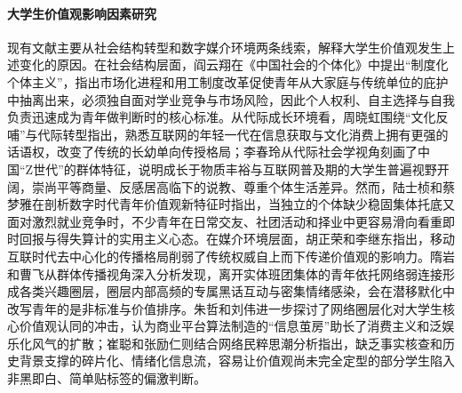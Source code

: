 \paragraph{大学生价值观影响因素研究}
现有文献主要从社会结构转型和数字媒介环境两条线索，解释大学生价值观发生上述变化的原因。在社会结构层面，阎云翔在《中国社会的个体化》中提出“制度化个体主义”，指出市场化进程和用工制度改革促使青年从大家庭与传统单位的庇护中抽离出来，必须独自面对学业竞争与市场风险，因此个人权利、自主选择与自我负责迅速成为青年做判断时的核心标准\cite{Yan2012}。从代际成长环境看，周晓虹围绕“文化反哺”与代际转型指出，熟悉互联网的年轻一代在信息获取与文化消费上拥有更强的话语权，改变了传统的长幼单向传授格局\cite{Zhou2020}；李春玲从代际社会学视角刻画了中国“Z世代”的群体特征，说明成长于物质丰裕与互联网普及期的大学生普遍视野开阔，崇尚平等商量、反感居高临下的说教、尊重个体生活差异\cite{Li2021}。然而，陆士桢和蔡梦雅在剖析数字时代青年价值观新特征时指出，当独立的个体缺少稳固集体托底又面对激烈就业竞争时，不少青年在日常交友、社团活动和择业中更容易滑向看重即时回报与得失算计的实用主义心态\cite{Lu2022}。在媒介环境层面，胡正荣和李继东指出，移动互联时代去中心化的传播格局削弱了传统权威自上而下传递价值观的影响力\cite{Hu2017}。隋岩和曹飞从群体传播视角深入分析发现，离开实体班团集体的青年依托网络弱连接形成各类兴趣圈层，圈层内部高频的专属黑话互动与密集情绪感染，会在潜移默化中改写青年的是非标准与价值排序\cite{Sui2021}。朱哲和刘伟进一步探讨了网络圈层化对大学生核心价值观认同的冲击，认为商业平台算法制造的“信息茧房”助长了消费主义和泛娱乐化风气的扩散\cite{Zhu2021}；崔聪和张励仁则结合网络民粹思潮分析指出，缺乏事实核查和历史背景支撑的碎片化、情绪化信息流，容易让价值观尚未完全定型的部分学生陷入非黑即白、简单贴标签的偏激判断\cite{Cui2023}。

